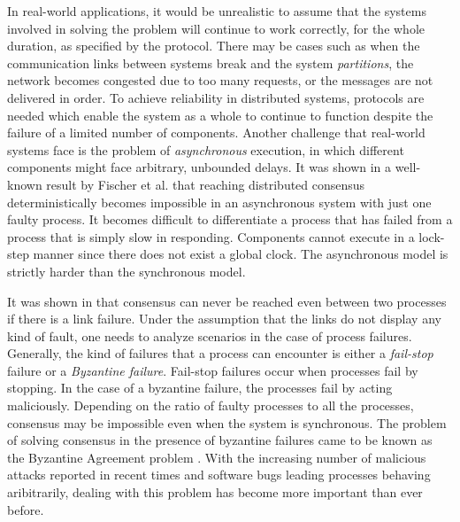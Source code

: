 In real-world applications, it would be unrealistic to assume that the systems involved in solving the problem will continue to work correctly, for the whole duration, as specified by the protocol. There may be cases such as when the communication links between systems break and the system \textit{partitions}, the network becomes congested due to too many requests, or the messages are not delivered in order. To achieve reliability in distributed systems, protocols are needed which enable the system as a whole to continue to function despite the failure of a limited number of components. Another challenge that real-world systems face is the problem of \textit{asynchronous} execution, in which different components might face arbitrary, unbounded delays. It was shown in a well-known result by Fischer et al. \cite{FischerLP83} that reaching distributed consensus deterministically becomes impossible in an asynchronous system with just one faulty process. It becomes difficult to differentiate a process that has failed from a process that is simply slow in responding. Components cannot execute in a lock-step manner since there does not exist a global clock. The asynchronous model is strictly harder than the synchronous model. 

It was shown in \cite{LamportSP82} that consensus can never be reached even between two processes if there is a link failure. Under the assumption that the links do not display any kind of fault, one needs to analyze scenarios in the case of process failures. Generally, the kind of failures that a process can encounter is either a \textit{fail-stop} failure or a \textit{Byzantine failure}. Fail-stop failures occur when processes fail by stopping. In the case of a byzantine failure, the processes fail by acting maliciously. Depending on the ratio of faulty processes to all the processes, consensus may be impossible even when the system is synchronous. The problem of solving consensus in the presence of byzantine failures came to be known as the Byzantine Agreement problem \cite{LamportSP82}. With the increasing number of malicious attacks reported in recent times and software bugs leading processes behaving aribitrarily, dealing with this problem has become more important than ever before.

